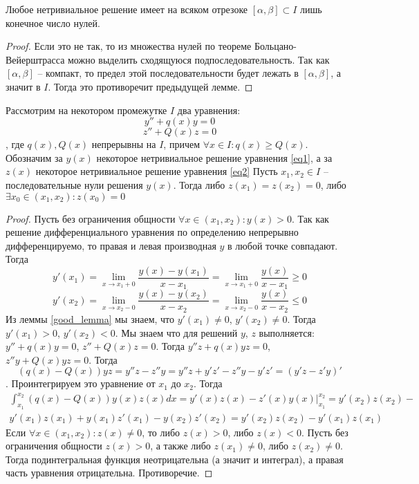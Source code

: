\documentclass[document.tex]{subfiles}
\begin{document}
\begin{corollary}
    Любое нетривиальное решение имеет на всяком отрезоке $[\alpha, \beta] \subset I$ лишь конечное число нулей.
\end{corollary}

\begin{proof}
    Если это не так, то из множества нулей по теореме Больцано-Вейерштрасса можно выделить сходящуюся
    подпоследовательность. Так как $[\alpha, \beta]$ -- компакт, то предел этой последовательности будет лежать в
    $[\alpha, \beta]$, а значит в $I$. Тогда это противоречит предыдущей лемме.
\end{proof}

\begin{theorem}[Штурм]
    Рассмотрим на некотором промежутке $I$ два уравнения:
    \begin{equation}
        \label{eq1}
        y'' + q(x)y = 0
    \end{equation}
    \begin{equation}
        \label{eq2}
        z'' + Q(x)z = 0
    \end{equation}, где $q(x), Q(x)$ непрерывны на $I$, причем $\forall x \in I: q(x) \geq Q(x)$. Обозначим за $y(x)$
    некоторое нетривиальное решение уравнения \ref{eq1}, а за $z(x)$ некоторое нетривиальное решение уравнения \ref{eq2}
    Пусть $x_1, x_2 \in I$ -- последовательные нули решения $y(x)$. Тогда либо $z(x_1) = z(x_2) = 0$, либо $\exists x_0
    \in (x_1, x_2): z(x_0) = 0$
\end{theorem}

\begin{proof}
    Пусть без ограничения общности $\forall x \in (x_1, x_2): y(x) > 0$. Так как решение дифференциального уравнения по
    определению непрерывно дифференцируемо, то правая и левая производная $y$ в любой точке совпадают. Тогда 
    \[
        y'(x_1) = \lim_{x \rightarrow x_1 + 0}
        \frac{y(x) - y(x_1)}{x - x_1} = \lim_{x \rightarrow  x_1 + 0} \frac{y(x)}{x - x_1} \geq 0
    \]
    \[
        y'(x_2) = \lim_{x \rightarrow x_2 - 0} \frac{y(x) - y(x_2)}{x - x_2} = \lim_{x \rightarrow x_2 - 0}
        \frac{y(x)}{x - x_2} \leq 0
    \]
    Из леммы \ref{good_lemma} мы знаем, что $y'(x_1) \neq 0$, $y'(x_2) \neq 0$. Тогда $y'(x_1) > 0$, $y'(x_2) < 0$. Мы
    знаем что для решений $y$, $z$ выполняется:
    $y'' + q(x)y = 0$, $z'' + Q(x)z = 0$. Тогда $y''z + q(x)yz = 0$, $z''y + Q(x)yz = 0$. 
    Тогда 
    \[
        (q(x) - Q(x))yz = y''z - z''y = y''z + y'z' - z''y - y'z' = (y'z - z'y)'
    \].
    Проинтегрируем это уравнение от $x_1$ до $x_2$.
    Тогда
    \begin{multline*}
        \int_{x_1}^{x_2}(q(x) - Q(x))y(x)z(x)dx = y'(x)z(x) - z'(x)y(x) \Big|_{x_1}^{x_2} = y'(x_2)z(x_2) -\\
        y'(x_1)z(x_1) + y(x_1)z'(x_1) - y(x_2)z'(x_2) = y'(x_2)z(x_2) - y'(x_1)z(x_1)
    \end{multline*}
    Если $\forall x \in (x_1, x_2): z(x) \neq 0$, то либо $z(x) > 0$, либо $z(x) < 0$. Пусть без ограничения общности
    $z(x) > 0$, а также либо $z(x_1) \neq 0$, либо $z(x_2) \neq 0$. Тогда подинтегральная функция неотрицательна (а
    значит и интеграл), а правая часть уравнения отрицательна. Противоречие.
\end{proof}
\end{document}
